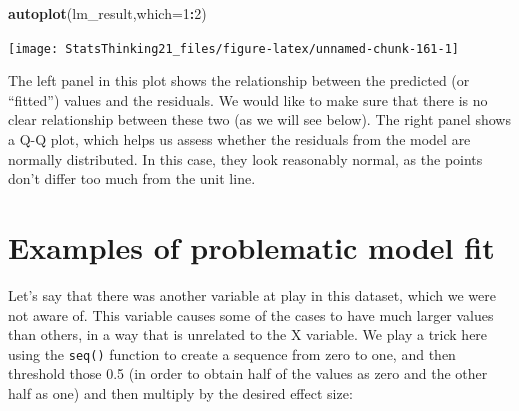 \documentclass[12pt,]{book}
\newenvironment{Shaded}{\begin{snugshade}}{\end{snugshade}}
\newcommand{\DataTypeTok}[1]{\textcolor[rgb]{0.13,0.29,0.53}{#1}}
\newcommand{\DecValTok}[1]{\textcolor[rgb]{0.00,0.00,0.81}{#1}}
\newcommand{\FloatTok}[1]{\textcolor[rgb]{0.00,0.00,0.81}{#1}}
\newcommand{\KeywordTok}[1]{\textcolor[rgb]{0.13,0.29,0.53}{\textbf{#1}}}
\newcommand{\NormalTok}[1]{#1}
\newcommand{\OperatorTok}[1]{\textcolor[rgb]{0.81,0.36,0.00}{\textbf{#1}}}
\newcommand{\StringTok}[1]{\textcolor[rgb]{0.31,0.60,0.02}{#1}}
\begin{document}
\begin{Shaded}
\begin{Highlighting}[]
\KeywordTok{autoplot}\NormalTok{(lm_result,}\DataTypeTok{which=}\DecValTok{1}\OperatorTok{:}\DecValTok{2}\NormalTok{)}
\end{Highlighting}
\end{Shaded}

\texttt{[image: StatsThinking21\_files/figure-latex/unnamed-chunk-161-1]}

The left panel in this plot shows the relationship between the predicted (or ``fitted'') values and the residuals. We would like to make sure that there is no clear relationship between these two (as we will see below). The right panel shows a Q-Q plot, which helps us assess whether the residuals from the model are normally distributed. In this case, they look reasonably normal, as the points don't differ too much from the unit line.

\hypertarget{examples-of-problematic-model-fit}{%
\section{Examples of problematic model fit}\label{examples-of-problematic-model-fit}}

Let's say that there was another variable at play in this dataset, which we were not aware of. This variable causes some of the cases to have much larger values than others, in a way that is unrelated to the X variable. We play a trick here using the \texttt{seq()} function to create a sequence from zero to one, and then threshold those 0.5 (in order to obtain half of the values as zero and the other half as one) and then multiply by the desired effect size:

\begin{Shaded}
\end{Shaded}
\end{document}
